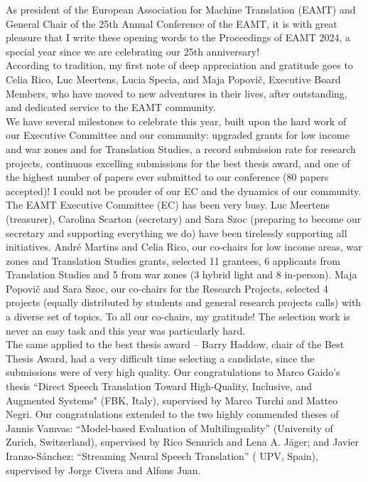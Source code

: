 As president of the European Association for Machine Translation (EAMT) and General Chair of the 25th Annual Conference of the EAMT, it is with great pleasure that I write these opening words to the Proceedings of EAMT 2024, a special year since we are celebrating our 25th anniversary!
\\

According to tradition, my first note of deep appreciation and gratitude goes to Celia Rico, Luc Meertens, Lucia Specia, and Maja Popovič, Executive Board Members, who have moved to new adventures in their lives, after outstanding, and dedicated service to the EAMT community.
\\

We have several milestones to celebrate this year, built upon the hard work of our Executive Committee and our community: upgraded grants for low income and war zones and for Translation Studies, a record submission rate for research projects, continuous excelling submissions for the best thesis award, and one of the highest number of papers ever submitted to our conference (80 papers accepted)! I could not be prouder of our EC and the dynamics of our community.
\\

The EAMT Executive Committee (EC) has been very busy. Luc Meertens (treasurer), Carolina Scarton (secretary) and Sara Szoc (preparing to become our secretary and supporting everything we do) have been tirelessly supporting all initiatives. André Martins and Celia Rico, our co-chairs for low income areas, war zones and Translation Studies grants, selected 11 grantees, 6 applicants from Translation Studies and 5 from war zones (3 hybrid light and 8 in-person). Maja Popovič and Sara Szoc, our co-chairs for the Research Projects, selected 4  projects (equally distributed by students and general research projects calls) with a diverse set of topics. To all our co-chairs, my gratitude! The selection work is never an easy task and this year was particularly hard. 
\\

The same applied to the best thesis award –  Barry Haddow, chair of the Best Thesis Award, had a very difficult time selecting a candidate, since the submissions were of very high quality. Our congratulations to Marco Gaido's thesis “Direct Speech Translation Toward High-Quality, Inclusive, and Augmented Systems" (FBK, Italy), supervised by Marco Turchi and Matteo Negri. Our congratulations extended to the two highly commended theses of Jannis Vamvas: “Model-based Evaluation of Multilinguality” (University of Zurich, Switzerland), supervised by Rico Sennrich and Lena A. Jäger; and Javier Iranzo-Sánchez: “Streaming Neural Speech Translation” ( UPV, Spain), supervised by Jorge Civera and Alfons Juan. 
\\

